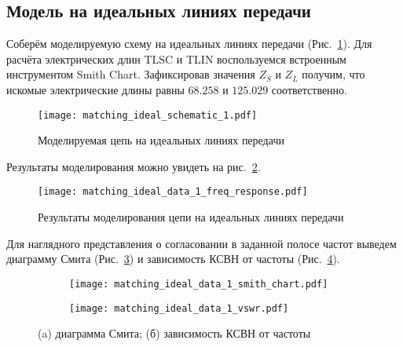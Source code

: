 \subsection{Модель на идеальных линиях передачи}

Соберём моделируемую схему на идеальных линиях передачи (Рис.~\ref{fig:matching_ideal_schematic_1}). Для расчёта электрических длин TLSC и TLIN воспользуемся встроенным инструментом Smith Chart. Зафиксировав значения $Z_S$ и $Z_L$ получим, что искомые электрические длины равны $68.258$ и $125.029$ соответственно.

\begin{figure}[!ht]
    \centering
    \texttt{[image: matching\_ideal\_schematic\_1.pdf]}
    \caption{Моделируемая цепь на идеальных линиях передачи}%
    \label{fig:matching_ideal_schematic_1}
\end{figure}

Результаты моделирования можно увидеть на рис.~\ref{fig:matching_ideal_data_1_freq_response}.

\begin{figure}[!ht]
    \centering
    \texttt{[image: matching\_ideal\_data\_1\_freq\_response.pdf]}
    \caption{Результаты моделирования цепи на идеальных линиях передачи}%
    \label{fig:matching_ideal_data_1_freq_response}
\end{figure}

Для наглядного представления о согласовании в заданной полосе частот выведем диаграмму Смита (Рис.~\ref{fig:matching_ideal_data_1_smith_chart}) и зависимость КСВН от частоты (Рис.~\ref{fig:matching_ideal_data_1_vswr}).

\begin{figure}[!ht]
    \begin{subfigure}[b]{0.45\textwidth}
        \centering
        \texttt{[image: matching\_ideal\_data\_1\_smith\_chart.pdf]}
        \caption{}%
    \label{fig:matching_ideal_data_1_smith_chart}
    \end{subfigure}
    \hfill
    \begin{subfigure}[b]{0.45\textwidth}
        \centering
        \texttt{[image: matching\_ideal\_data\_1\_vswr.pdf]}
        \caption{}%
    \label{fig:matching_ideal_data_1_vswr}
    \end{subfigure}
    \caption{%
        (a) диаграмма Смита;
        (б) зависимость КСВН от частоты
    }%
    \label{fig:matching_ideal_data_display_1}
\end{figure}

